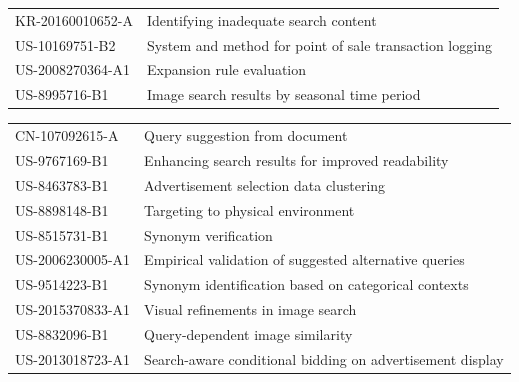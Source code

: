 \begin{table}[]
\begin{tabular}{ll}
KR-20160010652-A & Identifying inadequate search content                                                                           \\
US-10169751-B2   & System and method for point of sale transaction logging                                                         \\
US-2008270364-A1 & Expansion rule evaluation                                                                                       \\
US-8995716-B1    & Image search results by seasonal time period                                                                    \\
\end{tabular}
\end{table}
\begin{table}[]
\begin{tabular}{ll}
CN-107092615-A   & Query suggestion from document                                                                                  \\
US-9767169-B1    & Enhancing search results for improved readability                                                               \\
US-8463783-B1    & Advertisement selection data clustering                                                                         \\
US-8898148-B1    & Targeting to physical environment                                                                               \\
US-8515731-B1    & Synonym verification                                                                                            \\
US-2006230005-A1 & Empirical validation of suggested alternative queries                                                           \\
US-9514223-B1    & Synonym identification based on categorical contexts                                                            \\
US-2015370833-A1 & Visual refinements in image search                                                                              \\
US-8832096-B1    & Query-dependent image similarity                                                                                \\
US-2013018723-A1 & Search-aware conditional bidding on advertisement display                                                       \\

\end{tabular}
\end{table}
